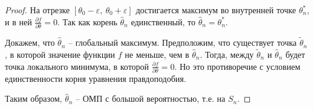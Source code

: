 \begin{proof}
    
    
    
    На отрезке $\displaystyle [ \theta _{0} -\varepsilon ,\ \theta _{0} +\varepsilon ]$ достигается максимум во внутренней точке $\displaystyle \theta _{n}^{*}$, и в ней $\displaystyle \frac{\partial f}{\partial \theta } =0$. Так как корень $\displaystyle \hat{\theta }_{n}$ единственный, то $\displaystyle \hat{\theta }_{n} =\theta _{n}^{*}$.
    
    Докажем, что $\displaystyle \hat{\theta }_{n}$ -- глобальный максимум. Предположим, что существует точка $\displaystyle \tilde{\theta }_{n}$, в которой значение функции $\displaystyle f$ не меньше, чем в $\displaystyle \hat{\theta }_{n}$. Тогда, между $\displaystyle \tilde{\theta }_{n}$ и $\displaystyle \hat{\theta }_{n}$ будет точка локального минимума, в которой $\displaystyle \frac{\partial f}{\partial \theta } =0$. Но это противоречие с условием единственности корня уравнения правдоподобия.
    
    Таким образом, $\displaystyle \hat{\theta }_{n}$ -- ОМП с большой вероятностью, т.е. на $\displaystyle S_{n}$.
\end{proof}

